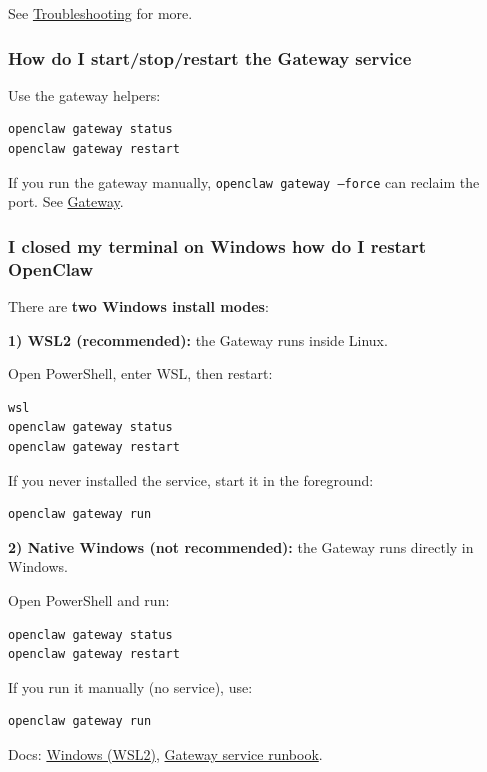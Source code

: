 See \href{/gateway/troubleshooting\#log-locations}{Troubleshooting} for more.

\subsubsection{How do I start/stop/restart the Gateway service}


Use the gateway helpers:

\begin{lstlisting}[language=bash]
openclaw gateway status
openclaw gateway restart
\end{lstlisting}


If you run the gateway manually, \texttt{openclaw gateway --force} can reclaim the port. See \href{/gateway}{Gateway}.

\subsubsection{I closed my terminal on Windows how do I restart OpenClaw}


There are \textbf{two Windows install modes}:

\textbf{1) WSL2 (recommended):} the Gateway runs inside Linux.

Open PowerShell, enter WSL, then restart:

\begin{lstlisting}
wsl
openclaw gateway status
openclaw gateway restart
\end{lstlisting}


If you never installed the service, start it in the foreground:

\begin{lstlisting}[language=bash]
openclaw gateway run
\end{lstlisting}


\textbf{2) Native Windows (not recommended):} the Gateway runs directly in Windows.

Open PowerShell and run:

\begin{lstlisting}
openclaw gateway status
openclaw gateway restart
\end{lstlisting}


If you run it manually (no service), use:

\begin{lstlisting}
openclaw gateway run
\end{lstlisting}


Docs: \href{/platforms/windows}{Windows (WSL2)}, \href{/gateway}{Gateway service runbook}.

